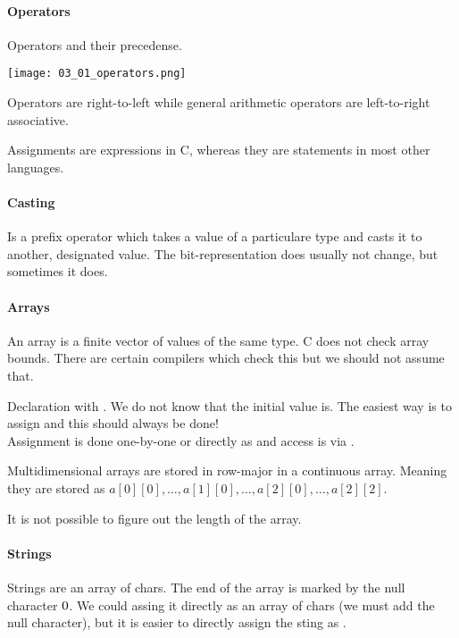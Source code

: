 

\paragraph{Operators}
Operators and their precedense.

\texttt{[image: 03\_01\_operators.png]}

Operators \code{=} are right-to-left while general arithmetic operators are left-to-right associative.

Assignments are expressions in C, whereas they are statements in most other languages.

\paragraph{Casting}
Is a prefix operator which takes a value of a particulare type and casts it to another, designated value. The bit-representation does usually not change, but sometimes it does.

\paragraph{Arrays}
An array is a finite vector of values of the same type. C does not check array bounds. There are certain compilers which check this but we should not assume that.

Declaration with . We do not know that the initial value is. The easiest way is to assign \code{= \{\};} and this should always be done!\\
Assignment is done one-by-one or directly as  and access is via .

Multidimensional arrays are stored in row-major in a continuous array. Meaning they are stored as $a[0][0], \dots, a[1][0], \dots, a[2][0], \dots, a[2][2]$.

It is not possible to figure out the length of the array.

\paragraph{Strings}
Strings are an array of chars. The end of the array is marked by the null character $\\0$. We could assing it directly as an array of chars  (we must add the null character), but it is easier to directly assign the sting as .

